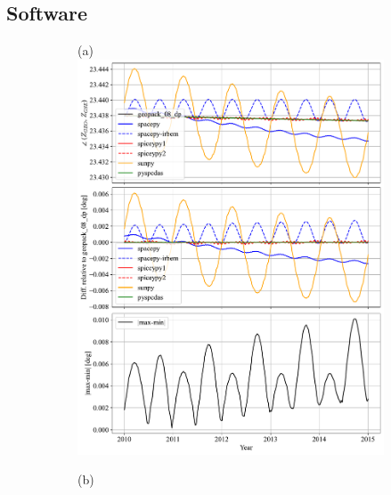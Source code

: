 \documentclass[draft]{agujournal2019}
\begin{document}
\subsection{Software}
\label{sect:comparisons_software}
\vspace{-1.5in}
\begin{figure}[htb]
     \begin{subfigure}[b]{0.49\textwidth}
         (a)
         \centering
         \includegraphics[width=\textwidth]{code/figures/angles/delta=1days_20100101-20150101/GEO_GSE.pdf}
     \end{subfigure}
     \begin{subfigure}[b]{0.49\textwidth}
         (b)
         \centering

\end{subfigure}
\end{figure}
\end{document}
